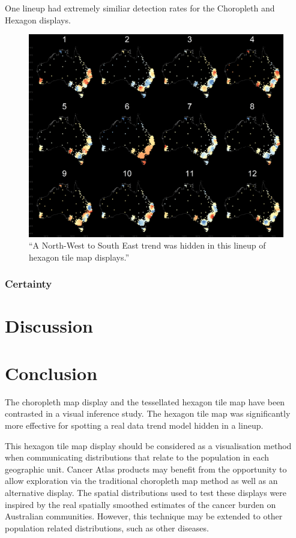 \documentclass[conference,final,]{IEEEtran}
\makeatletter
\def\maxwidth{\ifdim\Gin@nat@width>\linewidth\linewidth
\else\Gin@nat@width\fi}
\let\Oldincludegraphics\includegraphics
\renewcommand{\includegraphics}[1]{\Oldincludegraphics[width=\maxwidth]{#1}}
\makeatother
\begin{document}
One lineup had extremely similiar detection rates for the Choropleth and Hexagon displays.

\begin{figure}
\centering
\includegraphics{figures/aus_nwse_6_hex.png}
\caption{``A North-West to South East trend was hidden in this lineup of hexagon tile map displays.''}
\end{figure}

\hypertarget{certainty-1}{%
\subsubsection{Certainty}\label{certainty-1}}

\hypertarget{discussion}{%
\section{Discussion}\label{discussion}}

\hypertarget{conclusion}{%
\section{Conclusion}\label{conclusion}}

The choropleth map display and the tessellated hexagon tile map have been contrasted in a visual inference study.
The hexagon tile map was significantly more effective for spotting a real data trend model hidden in a lineup.

This hexagon tile map display should be considered as a visualisation method when communicating distributions that relate to the population in each geographic unit. Cancer Atlas products may benefit from the opportunity to allow exploration via the traditional choropleth map method as well as an alternative display. The spatial distributions used to test these displays were inspired by the real spatially smoothed estimates of the cancer burden on Australian communities. However, this technique may be extended to other population related distributions, such as other diseases.
\end{document}
